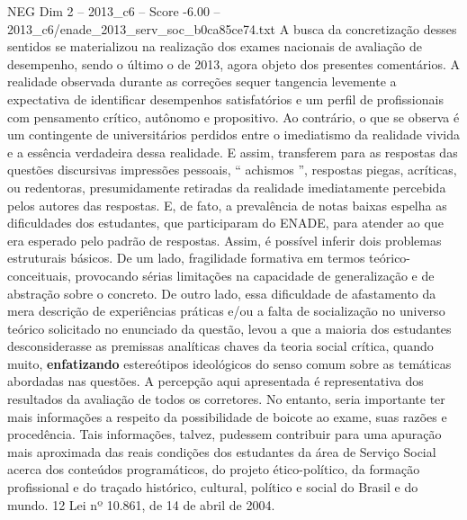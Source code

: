 \begin{textsample}{NEG Dim 2 – 2013\_c6 – Score -6.00 – 2013\_c6/enade\_2013\_serv\_soc\_b0ca85ce74.txt}
A busca da concretização desses sentidos se materializou na realização dos exames nacionais de avaliação de desempenho, sendo o último o de 2013, agora objeto dos presentes comentários.
A realidade observada durante as correções sequer tangencia levemente a expectativa de identificar desempenhos satisfatórios e um perfil de profissionais com pensamento crítico, autônomo e propositivo.
Ao contrário, o que se observa é um contingente de universitários perdidos entre o imediatismo da realidade vivida e a essência verdadeira dessa realidade.
E assim, transferem para as respostas das questões discursivas impressões pessoais, “ achismos ”, respostas piegas, acríticas, ou redentoras, presumidamente retiradas da realidade imediatamente percebida pelos autores das respostas.
E, de fato, a prevalência de notas baixas espelha as dificuldades dos estudantes, que participaram do ENADE, para atender ao que era esperado pelo padrão de respostas.
Assim, é possível inferir dois problemas estruturais básicos.
De um lado, fragilidade formativa em termos teórico-conceituais, provocando sérias limitações na capacidade de generalização e de abstração sobre o concreto.
De outro lado, essa dificuldade de afastamento da mera descrição de experiências práticas e/ou a falta de socialização no universo teórico solicitado no enunciado da questão, levou a que a maioria dos estudantes desconsiderasse as premissas analíticas chaves da teoria social crítica, quando muito, \textbf{enfatizando} estereótipos ideológicos do senso comum sobre as temáticas abordadas nas questões.
A percepção aqui apresentada é representativa dos resultados da avaliação de todos os corretores.
No entanto, seria importante ter mais informações a respeito da possibilidade de boicote ao exame, suas razões e procedência.
Tais informações, talvez, pudessem contribuir para uma apuração mais aproximada das reais condições dos estudantes da área de Serviço Social acerca dos conteúdos programáticos, do projeto ético-político, da formação profissional e do traçado histórico, cultural, político e social do Brasil e do mundo. 12 Lei nº 10.861, de 14 de abril de 2004.

\end{textsample}
